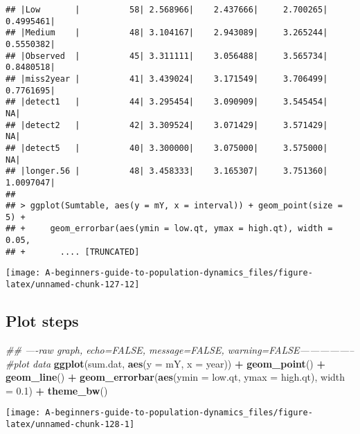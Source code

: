 \documentclass[]{book}
\newenvironment{Shaded}{\begin{snugshade}}{\end{snugshade}}
\newcommand{\CommentTok}[1]{\textcolor[rgb]{0.56,0.35,0.01}{\textit{#1}}}
\newcommand{\DataTypeTok}[1]{\textcolor[rgb]{0.13,0.29,0.53}{#1}}
\newcommand{\FloatTok}[1]{\textcolor[rgb]{0.00,0.00,0.81}{#1}}
\newcommand{\KeywordTok}[1]{\textcolor[rgb]{0.13,0.29,0.53}{\textbf{#1}}}
\newcommand{\NormalTok}[1]{#1}
\newcommand{\OperatorTok}[1]{\textcolor[rgb]{0.81,0.36,0.00}{\textbf{#1}}}
\newcommand{\StringTok}[1]{\textcolor[rgb]{0.31,0.60,0.02}{#1}}
\begin{document}
\begin{verbatim}
## |Low       |          58| 2.568966|    2.437666|     2.700265| 0.4995461|
## |Medium    |          48| 3.104167|    2.943089|     3.265244| 0.5550382|
## |Observed  |          45| 3.311111|    3.056488|     3.565734| 0.8480518|
## |miss2year |          41| 3.439024|    3.171549|     3.706499| 0.7761695|
## |detect1   |          44| 3.295454|    3.090909|     3.545454|        NA|
## |detect2   |          42| 3.309524|    3.071429|     3.571429|        NA|
## |detect5   |          40| 3.300000|    3.075000|     3.575000|        NA|
## |longer.56 |          48| 3.458333|    3.165307|     3.751360| 1.0097047|
## 
## > ggplot(Sumtable, aes(y = mY, x = interval)) + geom_point(size = 5) + 
## +     geom_errorbar(aes(ymin = low.qt, ymax = high.qt), width = 0.05, 
## +       .... [TRUNCATED]
\end{verbatim}

\begin{center}\texttt{[image: A-beginners-guide-to-population-dynamics\_files/figure-latex/unnamed-chunk-127-12]} \end{center}

\hypertarget{plot-steps-2}{%
\subsection{Plot steps}\label{plot-steps-2}}

\begin{Shaded}
\begin{Highlighting}[]
\CommentTok{## ----raw graph, echo=FALSE, message=FALSE, warning=FALSE-----------------}
\CommentTok{#plot data}
\KeywordTok{ggplot}\NormalTok{(sum.dat, }\KeywordTok{aes}\NormalTok{(}\DataTypeTok{y =}\NormalTok{ mY, }\DataTypeTok{x =}\NormalTok{ year)) }\OperatorTok{+}
\StringTok{  }\KeywordTok{geom_point}\NormalTok{() }\OperatorTok{+}
\StringTok{  }\KeywordTok{geom_line}\NormalTok{() }\OperatorTok{+}
\StringTok{  }\KeywordTok{geom_errorbar}\NormalTok{(}\KeywordTok{aes}\NormalTok{(}\DataTypeTok{ymin =}\NormalTok{ low.qt, }\DataTypeTok{ymax =}\NormalTok{ high.qt), }\DataTypeTok{width =} \FloatTok{0.1}\NormalTok{) }\OperatorTok{+}
\StringTok{  }\KeywordTok{theme_bw}\NormalTok{()}
\end{Highlighting}
\end{Shaded}

\begin{center}\texttt{[image: A-beginners-guide-to-population-dynamics\_files/figure-latex/unnamed-chunk-128-1]} \end{center}
\end{document}
